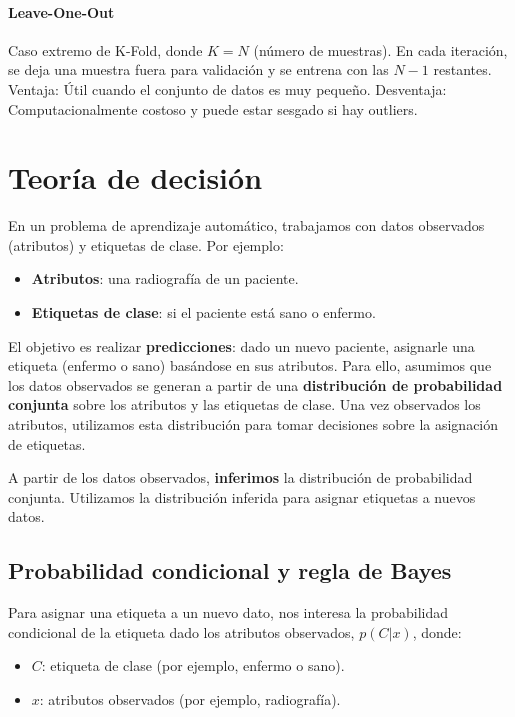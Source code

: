 \paragraph{Leave-One-Out}
 Caso extremo de K-Fold, donde $K=N$ (número de muestras). En cada iteración, se deja una muestra fuera para validación y se entrena con las $N-1$ restantes. Ventaja: Útil cuando el conjunto de datos es muy pequeño. Desventaja: Computacionalmente costoso y puede estar sesgado si hay outliers.

\section{Teoría de decisión}
En un problema de aprendizaje automático, trabajamos con datos observados (atributos) y etiquetas de clase. Por ejemplo:
\begin{itemize}
\item \textbf{Atributos}: una radiografía de un paciente.
\item \textbf{Etiquetas de clase}: si el paciente está sano o enfermo.
\end{itemize}

El objetivo es realizar \textbf{predicciones}: dado un nuevo paciente, asignarle una etiqueta (enfermo o sano) basándose en sus atributos. Para ello, asumimos que los datos observados se generan a partir de una \textbf{distribución de probabilidad conjunta} sobre los atributos y las etiquetas de clase. Una vez observados los atributos, utilizamos esta distribución para tomar decisiones sobre la asignación de etiquetas.

A partir de los datos observados, \textbf{inferimos} la distribución de probabilidad conjunta. Utilizamos la distribución inferida para asignar etiquetas a nuevos datos.

\subsection{Probabilidad condicional y regla de Bayes}
Para asignar una etiqueta a un nuevo dato, nos interesa la probabilidad condicional de la etiqueta dado los atributos observados, $p(C|x)$, donde:
\begin{itemize}
\item $C$: etiqueta de clase (por ejemplo, enfermo o sano).
\item $x$: atributos observados (por ejemplo, radiografía).
\end{itemize}

